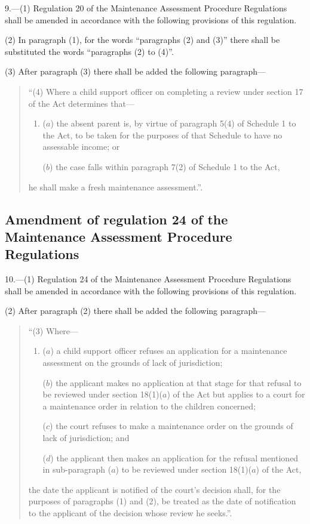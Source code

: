 \documentclass[12pt,a4paper]{article}
\begin{document}
9.—(1) Regulation 20 of the Maintenance Assessment Procedure Regulations shall be amended in accordance with the following provisions of this regulation.

(2) In paragraph (1), for the words “paragraphs (2) and (3)” there shall be substituted the words “paragraphs (2) to (4)”.

(3) After paragraph (3) there shall be added the following paragraph---
\begin{quotation}
“(4) Where a child support officer on completing a review under section 17 of the Act determines that---
\begin{enumerate}\item[]
($a$) the absent parent is, by virtue of paragraph 5(4) of Schedule 1 to the Act, to be taken for the purposes of that Schedule to have no assessable income; or

($b$) the case falls within paragraph 7(2) of Schedule 1 to the Act,
\end{enumerate}
he shall make a fresh maintenance assessment.”.
\end{quotation}

\subsection[10. Amendment of regulation 24 of the Maintenance Assessment Procedure Regulations]{Amendment of regulation 24 of the Maintenance Assessment Procedure Regulations}

10.—(1) Regulation 24 of the Maintenance Assessment Procedure Regulations shall be amended in accordance with the following provisions of this regulation.

(2) After paragraph (2) there shall be added the following paragraph---
\begin{quotation}
“(3) Where---
\begin{enumerate}\item[]
($a$) a child support officer refuses an application for a maintenance assessment on the grounds of lack of jurisdiction;

($b$) the applicant makes no application at that stage for that refusal to be reviewed under section 18(1)($a$) of the Act but applies to a court for a maintenance order in relation to the children concerned;

($c$) the court refuses to make a maintenance order on the grounds of lack of jurisdiction; and

($d$) the applicant then makes an application for the refusal mentioned in sub-paragraph ($a$) to be reviewed under section 18(1)($a$) of the Act,
\end{enumerate}
the date the applicant is notified of the court’s decision shall, for the purposes of paragraphs (1) and (2), be treated as the date of notification to the applicant of the decision whose review he seeks.”.
\end{quotation}
\end{document}
